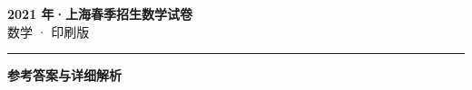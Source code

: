 \documentclass[zihao=5, a4paper]{ctexart}
\begin{document}
\begin{center}
  {\Large\bfseries 2021 年·上海春季招生数学试卷}\\[4pt]
  {\large 数学 · 印刷版}
\end{center}
\medskip
{}

\par\bigskip\hrule\bigskip
{}
\begin{center}{\large\bfseries 参考答案与详细解析}\end{center}
\smallskip

\end{document}
